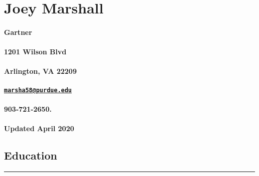 \documentclass[
]{article}
\author{}
\date{\vspace{-2.5em}}
\begin{document}
\hypertarget{joey-marshall}{%
\section{Joey Marshall}\label{joey-marshall}}

\hypertarget{gartner}{%
\paragraph{Gartner}\label{gartner}}

\hypertarget{wilson-blvd}{%
\paragraph{1201 Wilson Blvd}\label{wilson-blvd}}

\hypertarget{arlington-va-22209}{%
\paragraph{Arlington, VA 22209}\label{arlington-va-22209}}

\hypertarget{marsha58purdue.edu}{%
\paragraph{\texorpdfstring{\href{mailto:marsha58@purdue.edu}{\nolinkurl{marsha58@purdue.edu}}}{marsha58@purdue.edu}}\label{marsha58purdue.edu}}

\hypertarget{section}{%
\paragraph{903-721-2650.}\label{section}}

\hypertarget{updated-april-2020}{%
\paragraph{Updated April 2020}\label{updated-april-2020}}

\hypertarget{education}{%
\subsection{Education}\label{education}}

\begin{center}\rule{0.5\linewidth}{\linethickness}\end{center}
\end{document}

